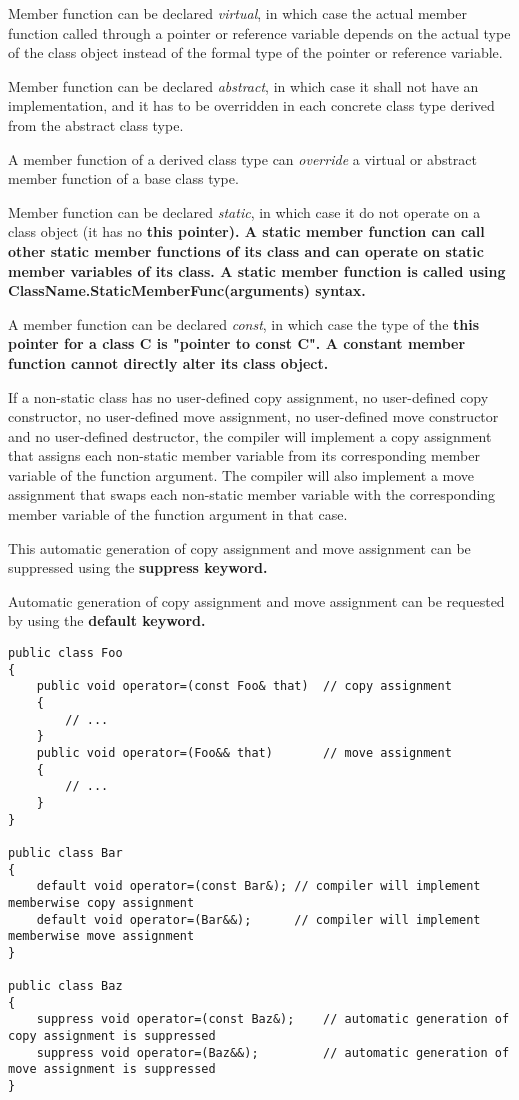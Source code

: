 \documentclass[a4paper,oneside,11pt]{article}
\begin{document}
Member function can be declared \emph{virtual}, in which case the actual member function called
through a pointer or reference variable depends on the actual type of the class object
instead of the formal type of the pointer or reference variable.

Member function can be declared \emph{abstract}, in which case it shall not have an implementation,
and it has to be overridden in each concrete class type derived from the abstract class type.

A member function of a derived class type can \emph{override} a virtual or abstract member function
of a base class type.

Member function can be declared \emph{static}, in which case it do not operate on a class object
(it has no \bf{this} pointer).
A static member function can call other static member functions of its class and can operate on
static member variables of its class.
A static member function is called using ClassName.StaticMemberFunc(arguments) syntax.

A member function can be declared \emph{const}, in which case the type of the \bf{this} pointer
for a class C is "pointer to \bf{const} C".
A constant member function cannot directly alter its class object.

If a non-static class has no user-defined copy assignment, no user-defined copy constructor,
no user-defined move assignment, no user-defined move constructor and no user-defined destructor,
the compiler will implement a copy assignment that assigns each non-static member variable
from its corresponding member variable of the function argument.
The compiler will also implement a move assignment that swaps each non-static member variable
with the corresponding member variable of the function argument in that case.

This automatic generation of copy assignment and move assignment can be suppressed using the
\bf{suppress} keyword.

Automatic generation of copy assignment and move assignment can be requested by using the \bf{default} keyword.

\begin{lstlisting}[frame=trBL]
public class Foo
{
    public void operator=(const Foo& that)  // copy assignment
    {
        // ...
    }
    public void operator=(Foo&& that)       // move assignment
    {
        // ...
    }
}

public class Bar
{
    default void operator=(const Bar&); // compiler will implement memberwise copy assignment
    default void operator=(Bar&&);      // compiler will implement memberwise move assignment
}

public class Baz
{
    suppress void operator=(const Baz&);    // automatic generation of copy assignment is suppressed
    suppress void operator=(Baz&&);         // automatic generation of move assignment is suppressed
}
\end{lstlisting}
\end{document}
